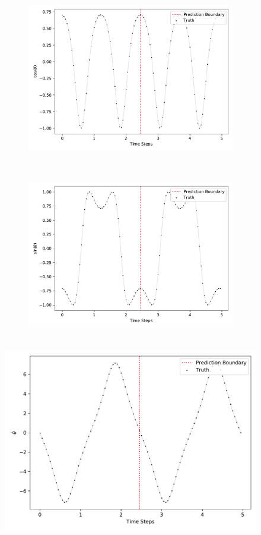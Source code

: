 			\begin{figure}
				\centering
				\begin{subfigure}{0.5\linewidth}
					\centering
					\includegraphics[width=\linewidth]{figures/experiments/environments/observations-pendulum-gym-N0-D0.pdf}
				\end{subfigure}%
				~
				\begin{subfigure}{0.5\linewidth}
					\centering
					\includegraphics[width=\linewidth]{figures/experiments/environments/observations-pendulum-gym-N0-D1.pdf}
				\end{subfigure} \\
				\includegraphics[width=0.5\linewidth]{figures/experiments/environments/observations-pendulum-gym-N0-D2.pdf}

\end{figure}
